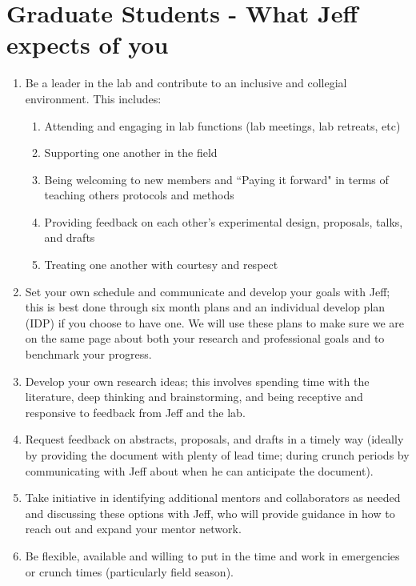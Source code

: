 \documentclass[12pt]{article}
\begin{document}
\section{Graduate Students - What Jeff expects of you}
\begin{enumerate}
\item Be a leader in the lab and contribute to an inclusive and collegial environment. This includes:
\begin{enumerate}
\item Attending and engaging in lab functions (lab meetings, lab retreats, etc) 
\item Supporting one another in the field 
\item Being welcoming to new members and ``Paying it forward" in terms of teaching others protocols and methods
\item Providing feedback on each other's experimental design, proposals, talks, and drafts
\item Treating one another with courtesy and respect
\end{enumerate}

\item Set your own schedule and communicate and develop your goals with Jeff; this is best done through six month plans and an individual develop plan (IDP) if you choose to have one. We will use these plans to make sure we are on the same page about both your research and professional goals and to benchmark your progress.

\item Develop your own research ideas; this involves spending time with the literature, deep thinking and brainstorming, and being receptive and responsive to feedback from Jeff and the lab.

\item Request feedback on abstracts, proposals, and drafts in a timely way (ideally by providing the document with plenty of lead time; during crunch periods by communicating with Jeff about when he can anticipate the document). 

\item Take initiative in identifying additional mentors and collaborators as needed and discussing these options with Jeff, who will provide guidance in how to reach out and expand your mentor network.

\item Be flexible, available and willing to put in the time and work in emergencies or crunch times (particularly field season).


\end{enumerate}
\end{document}
